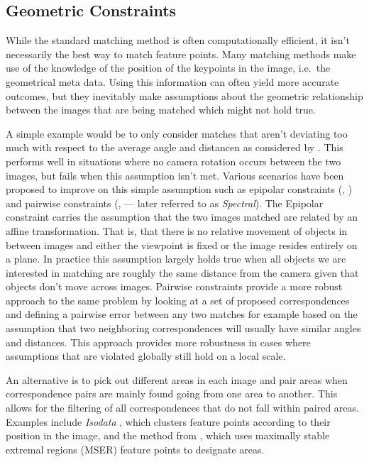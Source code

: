 \subsection{Geometric Constraints}

While the standard matching method is often computationally efficient, 
it isn't necessarily the best way to match feature points. Many matching 
methods make use of the knowledge of the position of the keypoints in 
the image, i.e.\ the geometrical meta data. Using this information can 
often yield more accurate outcomes, but they inevitably make assumptions
about the geometric relationship between the images that are being 
matched which might not hold true.  

A simple example would be to only consider matches that aren't deviating 
too much with respect to the average angle and distancen as considered 
by \cite{kim2008efficient}.  This performs well in situations where no 
camera rotation occurs between the two images, but fails when this 
assumption isn't met. Various scenarios have been proposed to improve on 
this simple assumption such as epipolar constraints 
(\cite{torr2000mlesac}, \cite{chum2005matching}) and pairwise 
constraints (\cite{choi2009robust}, \cite{leordeanu2005spectral} --- 
later referred to as \emph{Spectral}).  The Epipolar constraint carries 
the assumption that the two images matched are related by an affine 
transformation.  That is, that there is no relative movement of objects 
in between images and either the viewpoint is fixed or the image resides 
entirely on a plane.  In practice this assumption largely holds true 
when all objects we are interested in matching are roughly the same 
distance from the camera given that objects don't move across images.  
Pairwise constraints provide a more robust approach to the same problem 
by looking at a set of proposed correspondences and defining a pairwise 
error between any two matches for example based on the assumption that 
two neighboring correspondences will usually have similar angles and 
distances. This approach provides more robustness in cases where 
assumptions that are violated globally still hold on a local scale.

An alternative is to pick out different areas in each image and pair 
areas when correspondence pairs are mainly found going from one area to 
another. This allows for the filtering of all correspondences that do 
not fall within paired areas. Examples include \emph{Isodata} 
\cite{das2008event}, which clusters feature points according to their 
position in the image, and the method from \cite{wu2011robust}, which 
uses maximally stable extremal regions (MSER) feature points to 
designate areas. 

